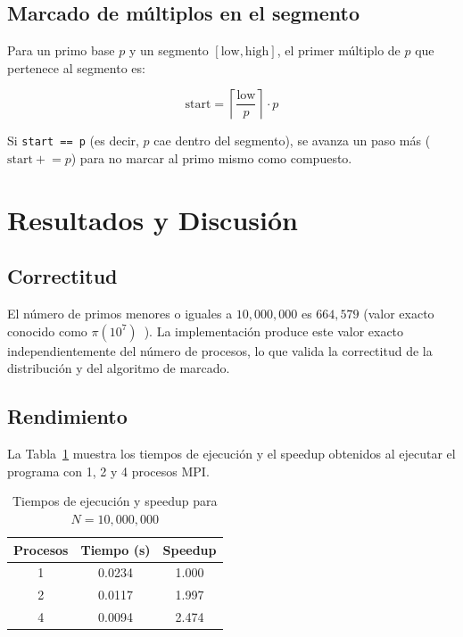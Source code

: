 \documentclass[conference]{IEEEtran}
\begin{document}
\subsection{Marcado de múltiplos en el segmento}

Para un primo base $p$ y un segmento $[\text{low}, \text{high}]$, el primer
múltiplo de $p$ que pertenece al segmento es:

\begin{equation}
  \text{start} = \left\lceil \frac{\text{low}}{p} \right\rceil \cdot p
\end{equation}

Si \texttt{start == p} (es decir, $p$ cae dentro del segmento), se avanza
un paso más ($\text{start} \mathrel{+}= p$) para no marcar al primo mismo como
compuesto.

\section{Resultados y Discusión}

\subsection{Correctitud}

El número de primos menores o iguales a $10{,}000{,}000$ es $664{,}579$
(valor exacto conocido como $\pi(10^7)$~\cite{bach1996}). La implementación
produce este valor exacto independientemente del número de procesos, lo que
valida la correctitud de la distribución y del algoritmo de marcado.

\subsection{Rendimiento}

La Tabla~\ref{tab:speedup} muestra los tiempos de ejecución y el speedup
obtenidos al ejecutar el programa con 1, 2 y 4 procesos MPI.

\begin{table}[h]
\caption{Tiempos de ejecución y speedup para $N = 10{,}000{,}000$}
\label{tab:speedup}
\centering
\begin{tabular}{@{}ccc@{}}
\toprule
\textbf{Procesos} & \textbf{Tiempo (s)} & \textbf{Speedup} \\
\midrule
1 & 0.0234 & 1.000 \\
2 & 0.0117 & 1.997 \\
4 & 0.0094 & 2.474 \\
\bottomrule
\end{tabular}
\end{table}
\end{document}
